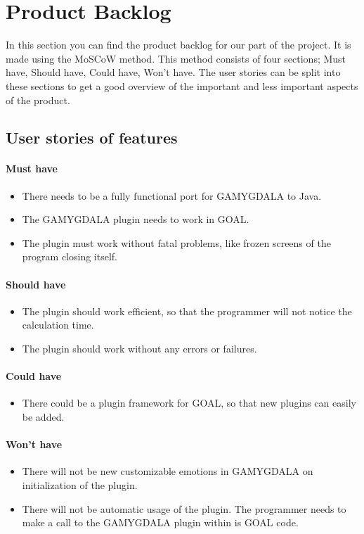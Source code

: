 \section{Product Backlog}
In this section you can find the product backlog for our part of the project. It is made using the MoSCoW method. This method consists of four sections; Must have, Should have, Could have, Won't have. The user stories can be split into these sections to get a good overview of the important and less important aspects of the product.

\subsection{User stories of features}
\paragraph{Must have} 
\begin{itemize}
\item There needs to be a fully functional port for \gls{GAMYGDALA} to Java.
\item The \gls{GAMYGDALA} plugin needs to work in \gls{GOAL}.
\item The plugin must work without fatal problems, like frozen screens of the program closing itself.
\end{itemize}

\paragraph{Should have} 
\begin{itemize}
\item The plugin should work efficient, so that the programmer will not notice the calculation time.
\item The plugin should work without any errors or failures. 
\end{itemize}

\paragraph{Could have} 
\begin{itemize}
\item There could be a plugin framework for \gls{GOAL}, so that new plugins can easily be added.
\end{itemize}

\paragraph{Won't have} 
\begin{itemize}
\item There will not be new customizable emotions in \gls{GAMYGDALA} on initialization of the plugin.
\item There will not be automatic usage of the plugin. The programmer needs to make a call to the \gls{GAMYGDALA} plugin within is \gls{GOAL} code.
\end{itemize}

